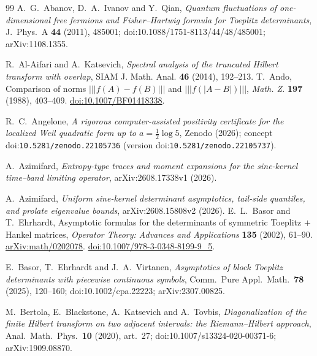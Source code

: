 \begin{thebibliography}{99}
\small
{} A.~G.~Abanov, D.~A.~Ivanov and Y.~Qian,
\emph{Quantum fluctuations of one-dimensional free fermions and Fisher--Hartwig
formula for Toeplitz determinants}, J.\ Phys.\ A \textbf{44} (2011), 485001;
doi:10.1088/1751-8113/44/48/485001; arXiv:1108.1355.

 R.~Al-Aifari and A.~Katsevich,
\emph{Spectral analysis of the truncated Hilbert transform with overlap},
SIAM J. Math. Anal. \textbf{46} (2014), 192--213.
T.~Ando, Comparison of norms $\lvert\!\lvert\!\lvert f(A)-f(B)\rvert\!\rvert\!\rvert$
and $\lvert\!\lvert\!\lvert f(|A-B|)\rvert\!\rvert\!\rvert$,
\emph{Math. Z.} \textbf{197} (1988), 403--409.
\href{https://doi.org/10.1007/BF01418338}{doi:10.1007/BF01418338}.

 R.~C.~Angelone, \emph{A rigorous computer-assisted
positivity certificate for the localized Weil quadratic form up to
$a=\tfrac12\log5$}, Zenodo (2026);
concept doi:\nolinkurl{10.5281/zenodo.22105736}
(version doi:\nolinkurl{10.5281/zenodo.22105737}).

 A.~Azimifard, \emph{Entropy-type traces and moment
expansions for the sine-kernel time--band limiting operator}, arXiv:2608.17338v1
(2026).

 A.~Azimifard,
\emph{Uniform sine-kernel determinant asymptotics, tail-side quantiles,
and prolate eigenvalue bounds}, arXiv:2608.15808v2 (2026).
E.~L.~Basor and T.~Ehrhardt, Asymptotic formulas for the determinants of
symmetric Toeplitz $+$ Hankel matrices,
\emph{Operator Theory: Advances and Applications} \textbf{135} (2002),
61--90. \href{https://arxiv.org/abs/math/0202078}{arXiv:math/0202078}.
\href{https://doi.org/10.1007/978-3-0348-8199-9_5}{doi:10.1007/978-3-0348-8199-9\_5}.

 E.~Basor, T.~Ehrhardt and J.~A.~Virtanen,
\emph{Asymptotics of block Toeplitz determinants with piecewise continuous
symbols}, Comm.\ Pure Appl.\ Math.\ \textbf{78} (2025), 120--160;
doi:10.1002/cpa.22223; arXiv:2307.00825.

 M.~Bertola, E.~Blackstone, A.~Katsevich and
A.~Tovbis, \emph{Diagonalization of the finite Hilbert transform on two
adjacent intervals: the Riemann--Hilbert approach}, Anal.\ Math.\ Phys.\
\textbf{10} (2020), art.~27; doi:10.1007/s13324-020-00371-6;
arXiv:1909.08870.


\end{thebibliography}
